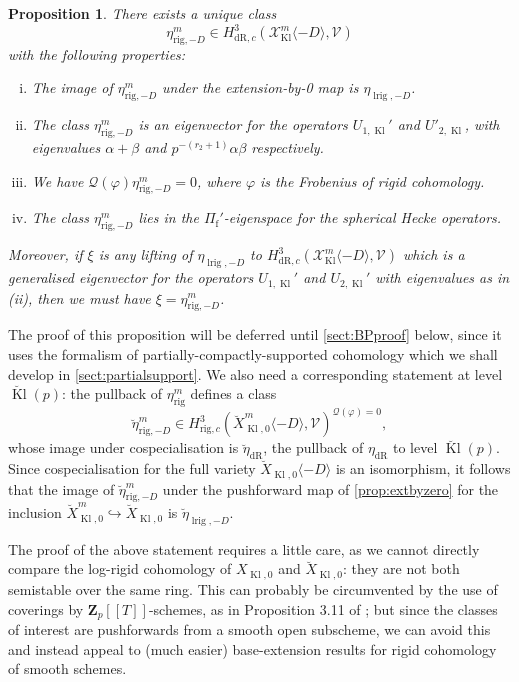 \documentclass[cjm]{ipart}
\theoremstyle{plain}
\newtheorem{proposition}[theorem]{Proposition}
\theoremstyle{remark}
\DeclareMathOperator{\Kl}{Kl}
\DeclareMathOperator{\lrig}{lrig}
\newcommand{\Pif}{\Pi_{\mathrm{f}}}
\newcommand{\Zp}{\mathbf{Z}_p}
\newcommand{\cQ}{\mathcal{Q}}
\newcommand{\cV}{\mathcal{V}}
\newcommand{\cX}{\mathcal{X}}
\newcommand{\dR}{\mathrm{dR}}
\newcommand{\into}{\hookrightarrow}
\newcommand{\rig}{\mathrm{rig}}
\numberwithin{equation}{subsection}
\begin{document}
  \begin{proposition}
   \label{prop:BPrigclass}
   There exists a unique class
   \[ \eta_{\rig, -D}^m \in H^3_{\dR, c}\left( \cX_{\Kl}^m\langle -D \rangle, \cV\right)\]
   with the following properties:
   \begin{enumerate}[(i)]
    \item The image of $\eta_{\rig,-D}^m$ under the extension-by-0 map is $\eta_{\lrig, -D}$.
    \item The class $\eta_{\rig,-D}^m$ is an eigenvector for the operators $U_{1, \Kl}'$ and $U'_{2, \Kl}$, with eigenvalues $\alpha + \beta$ and $p^{-(r_2+1)} \alpha\beta$ respectively.
    \item We have $\cQ(\varphi) \eta_{\rig,-D}^m = 0$, where $\varphi$ is the Frobenius of rigid cohomology.
    \item The class $\eta_{\rig,-D}^m$ lies in the $\Pif'$-eigenspace for the spherical Hecke operators.
   \end{enumerate}
   Moreover, if $\xi$ is any lifting of $\eta_{\lrig, -D}$ to $H^3_{\dR, c}\left( \cX_{\Kl}^m\langle -D \rangle, \cV\right)$ which is a \emph{generalised} eigenvector for the operators $U_{1, \Kl}'$ and $U_{2, \Kl}'$ with eigenvalues as in (ii), then we must have $\xi = \eta_{\rig,-D}^m$.
  \end{proposition}

  The proof of this proposition will be deferred until \cref{sect:BPproof} below, since it uses the formalism of partially-compactly-supported cohomology which we shall develop in \cref{sect:partialsupport}. We also need a corresponding statement at level $\breve{\Kl}(p)$: the pullback of $\eta_{\rig}^m$ defines a class
  \[ \breve\eta_{\rig,-D}^m \in H^3_{\rig, c}\left( \breve{X}_{\Kl, 0}^m\langle -D \rangle, \cV\right)^{\cQ(\varphi) = 0}, \]
  whose image under cospecialisation is $\breve{\eta}_{\dR}$, the pullback of $\eta_{\dR}$ to level $\breve{\Kl}(p)$. Since cospecialisation for the full variety $\breve{X}_{\Kl, 0}\langle -D \rangle$ is an isomorphism, it follows that the image of $\breve\eta_{\rig,-D}^m$ under the pushforward map of \cref{prop:extbyzero} for the inclusion $\breve{X}_{\Kl, 0}^m \into \breve{X}_{\Kl, 0}$ is $\breve\eta_{\lrig,-D}$.

  \begin{remark}
   The proof of the above statement requires a little care, as we cannot directly compare the log-rigid cohomology of $X_{\Kl, 0}$ and $\breve{X}_{\Kl, 0}$: they are not both semistable over the same ring. This can probably be circumvented by the use of coverings by $\Zp[[T]]$-schemes, as in Proposition 3.11 of \cite{nekovarniziol16}; but since the classes of interest are pushforwards from a smooth open subscheme, we can avoid this and instead appeal to (much easier) base-extension results for rigid cohomology of smooth schemes.
  \end{remark}
\end{document}
